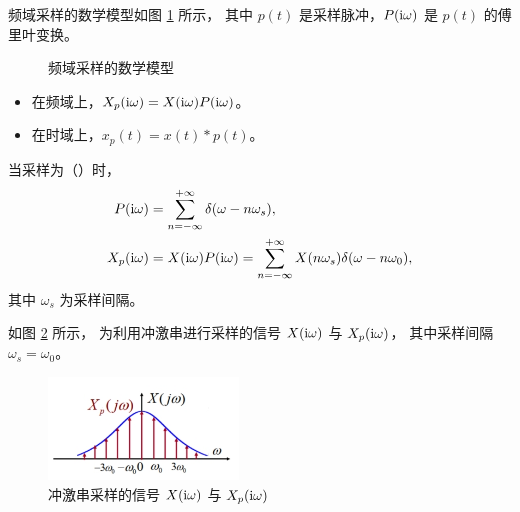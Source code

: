 \begin{definition}[频域采样]
    频域采样的数学模型如图 \ref{fig:sampling-freq-math-model} 所示，
    其中 $p(t)$ 是采样脉冲，$P(\mathrm{i} \omega)$ 是 $p(t)$ 的傅里叶变换。
    \begin{figure}[H]
        \centering
        \caption{频域采样的数学模型}
        \label{fig:sampling-freq-math-model}
    \end{figure}

    \begin{itemize}
        \item 在频域上，$X_p(\mathrm{i} \omega) = X(\mathrm{i} \omega) P(\mathrm{i} \omega)$。
        \item 在时域上，$x_p(t) = x(t) * p(t)$。
    \end{itemize}
    当采样为（）时，
    \begin{align*}
        P(\mathrm{i}\omega) & = \sum_{n = -\infty}^{+\infty}\delta(\omega - n\omega_s), \\
        X_p(\mathrm{i}\omega) & = X(\mathrm{i}\omega)P(\mathrm{i}\omega) = \sum_{n = -\infty}^{+\infty}X(n\omega_s)\delta(\omega - n\omega_0),
    \end{align*}
    其中 $\omega_s$ 为采样间隔。
\end{definition}

\begin{example}
    如图 \ref{fig:impulse-sampling-freq} 所示，
    为利用冲激串进行采样的信号 $X(\mathrm{i}\omega)$ 与 $X_p(\mathrm{i}\omega)$，
    其中采样间隔 $\omega_s = \omega_0$。
    \begin{figure}[H]
        \centering
        \includegraphics[width=0.45\textwidth]{chap2/img/impulse-sampling-freq.png}
        \caption{冲激串采样的信号 $X(\mathrm{i}\omega)$ 与 $X_p(\mathrm{i}\omega)$}
        \label{fig:impulse-sampling-freq}
    \end{figure}
\end{example}

